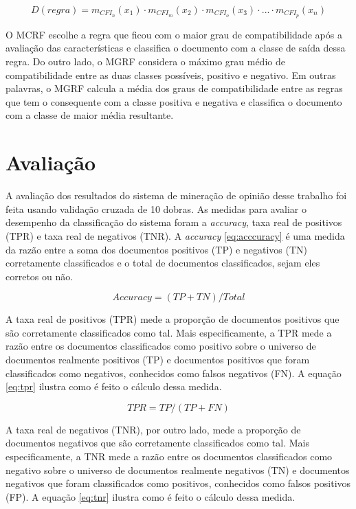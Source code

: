 \begin{equation}
D(regra) = m_{CFI_n}(x_1) \cdot m_{CFI_m}(x_2) \cdot m_{CFI_o}(x_3) \cdot ...\cdot m_{CFI_p}(x_n)
\label{eq:compat_regra}
\end{equation}

O MCRF escolhe a regra que ficou com o maior grau de compatibilidade após a avaliação das características e classifica o documento com a classe de saída dessa regra. Do outro lado, o MGRF considera o máximo grau médio de compatibilidade entre as duas classes possíveis, positivo e negativo. Em outras palavras, o MGRF calcula a média dos graus de compatibilidade entre as regras que tem o consequente com a classe positiva e negativa e classifica o documento com a classe de maior média resultante. 

\section{Avaliação}

A avaliação dos resultados do sistema de mineração de opinião desse trabalho foi feita usando validação cruzada de 10 dobras. As medidas para avaliar o desempenho da classificação do sistema foram a \textit{accuracy}, taxa real de positivos (TPR) e taxa real de negativos (TNR). A \textit{accuracy} \ref{eq:acccuracy} é uma medida da razão entre a soma dos documentos positivos (TP) e negativos (TN) corretamente classificados e o total de documentos classificados, sejam eles corretos ou não.

\begin{equation}
Accuracy =  (TP + TN) / Total
\label{eq:acccuracy}
\end{equation}

A taxa real de positivos (TPR) mede a proporção de documentos positivos que são corretamente classificados como tal. Mais especificamente, a TPR mede a razão entre os documentos classificados como positivo sobre o universo de documentos realmente positivos (TP) e documentos positivos que foram classificados como negativos, conhecidos como falsos negativos (FN). A equação \ref{eq:tpr} ilustra como é feito o cálculo dessa medida. 

\begin{equation}
TPR = TP / (TP + FN)
\label{eq:tpr}
\end{equation}

A taxa real de negativos (TNR), por outro lado, mede a proporção de documentos negativos que são corretamente classificados como tal. Mais especificamente, a TNR mede a razão entre os documentos classificados como negativo sobre o universo de documentos realmente negativos (TN) e documentos negativos que foram classificados como positivos, conhecidos como falsos positivos (FP). A equação \ref{eq:tnr} ilustra como é feito o cálculo dessa medida. 


